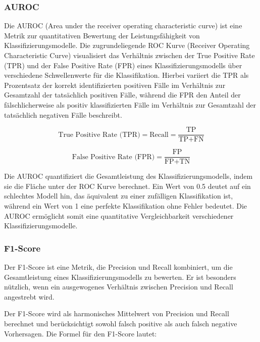 \subsubsection{AUROC}
Die AUROC (Area under the receiver operating characteristic curve) ist eine Metrik zur quantitativen Bewertung der Leistungsfähigkeit von Klassifizierungsmodelle. Die zugrundeliegende ROC Kurve (Receiver Operating Characteristic Curve) visualisiert das Verhältnis zwischen der True Positive Rate (TPR) und der False Positive Rate (FPR) eines Klassifizierungsmodells über verschiedene Schwellenwerte für die Klassifikation. Hierbei variiert die TPR als Prozentsatz der korrekt identifizierten positiven Fälle im Verhältnis zur Gesamtzahl der tatsächlich positiven Fälle, während die FPR den Anteil der fälschlicherweise als positiv klassifizierten Fälle im Verhältnis zur Gesamtzahl der tatsächlich negativen Fälle beschreibt.

\begin{equation}
    \text{True Positive Rate (TPR)} = \text{Recall} =\frac{\text{TP}}{\text{TP} + \text{FN}}
    \label{eq:TPR}
\end{equation}

\begin{equation}
    \text{False Positive Rate (FPR)} = \frac{\text{FP}}{\text{FP} + \text{TN}} 
    \label{eq:FPR}
\end{equation}

Die AUROC quantifiziert die Gesamtleistung des Klassifizierungsmodells, indem sie die Fläche unter der ROC Kurve berechnet. Ein Wert von 0.5 deutet auf ein schlechtes Modell hin, das äquivalent zu einer zufälligen Klassifikation ist, während ein Wert von 1 eine perfekte Klassifikation ohne Fehler bedeutet. Die AUROC ermöglicht somit eine quantitative Vergleichbarkeit verschiedener Klassifizierungsmodelle.


\subsubsection{F1-Score}
Der F1-Score ist eine Metrik, die Precision und Recall kombiniert, um die Gesamtleistung eines Klassifizierungsmodells zu bewerten. Er ist besonders nützlich, wenn ein ausgewogenes Verhältnis zwischen Precision und Recall angestrebt wird.

Der F1-Score wird als harmonisches Mittelwert von Precision und Recall berechnet und berücksichtigt sowohl falsch positive als auch falsch negative Vorhersagen. Die Formel für den F1-Score lautet:

